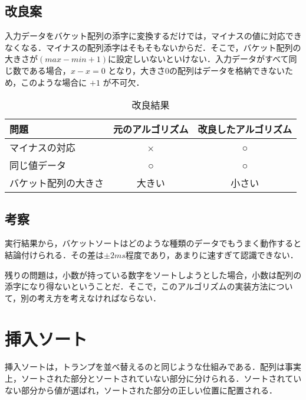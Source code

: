 \documentclass[a4j, titlepage]{jarticle}
\begin{document}
        \subsection{改良案}
            入力データをバケット配列の添字に変換するだけでは，マイナスの値に対応できなくなる．マイナスの配列添字はそもそもないからだ．そこで，バケット配列の大きさが$(max - min + 1)$に設定しいないといけない．入力データがすべて同じ数である場合，$ x - x = 0 $ となり，大きさ0の配列はデータを格納できないため，このような場合に $+ 1$ が不可欠．
            \begin{table}[tbh]
                \caption{改良結果}
                \label{tab:bucket_problem}
                \begin{center}
                    \begin{tabular}{|l|c|c|}
                        \hline
                        問題 & 元のアルゴリズム & 改良したアルゴリズム\\ \hline
                        マイナスの対応 & × & ○\\ \hline
                        同じ値データ & ○ & ○\\ \hline
                        バケット配列の大きさ & 大きい & 小さい\\ \hline
                    \end{tabular}
                \end{center}
            \end{table}

        \subsection{考察}
            実行結果から，バケットソートはどのような種類のデータでもうまく動作すると結論付けられる．その差は$\pm 2 ms$程度であり，あまりに速すぎて認識できない．

            残りの問題は，小数が持っている数字をソートしようとした場合，小数は配列の添字になり得ないということだ．そこで，このアルゴリズムの実装方法について，別の考え方を考えなければならない．


    \section{挿入ソート}
        挿入ソートは，トランプを並べ替えるのと同じような仕組みである．配列は事実上，ソートされた部分とソートされていない部分に分けられる．ソートされていない部分から値が選ばれ，ソートされた部分の正しい位置に配置される．
\end{document}
